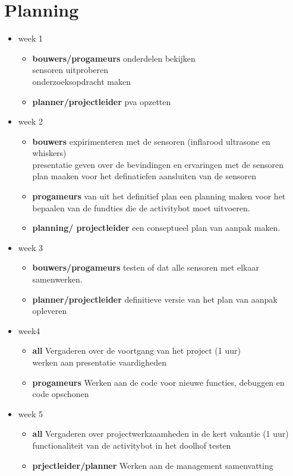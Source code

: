 \documentclass[oneside]{book}
\begin{document}
\clearpage
\chapter{Planning}
\begin{itemize}
\item week 1 
	\begin{itemize}		
	\item \textbf{bouwers/progameurs}
		onderdelen bekijken\\
		sensoren uitproberen\\
		onderzoeksopdracht maken\\
	\item \textbf{planner/projectleider}
		pva opzetten
	\end{itemize}
\item week 2
	\begin{itemize}	
	\item \textbf{bouwers}
		expirimenteren met de sensoren (inflarood ultrasone en whiskers)\\
		presentatie geven over de bevindingen en ervaringen met de sensoren\\
		plan maaken voor het definatiefen aansluiten van de sensoren
	\item \textbf{progameurs}
		van uit het definitief plan een planning maken voor het bepaalen van de fundties die de activitybot moet uitvoeren.
	\item \textbf{planning/ projectleider}
		een conseptueel plan van aanpak maken.
	\end{itemize}
\item week 3
	\begin{itemize}	
	\item \textbf{bouwers/progameurs} 
		testen of dat alle sensoren met elkaar samenwerken.
	\item \textbf{planner/projectleider}
		definitieve versie van het plan van aanpak opleveren
	\end{itemize}
\item week4
	\begin{itemize}	
	\item \textbf{all}
		Vergaderen over de voortgang van het project (1 uur)\\
		werken aan presentatie vaardigheden	
	\item \textbf{progameurs}
		Werken aan de code voor nieuwe functies, debuggen en code opschonen
	\end{itemize}
\item week 5
	\begin{itemize}	
	\item \textbf{all}
		Vergaderen over projectwerkzaamheden in de kert vakantie (1 uur)\\
		functionaliteit van de activitybot in het doolhof testen
	\item \textbf{prjectleider/planner}
		Werken aan de management samenvatting
	\end{itemize}


\end{itemize}
\end{document}
